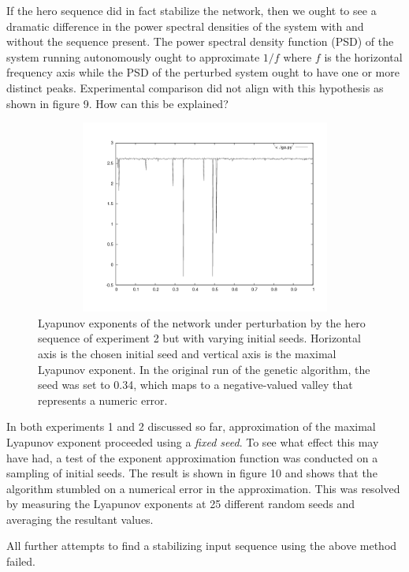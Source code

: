 \documentclass[12pt]{article}
\begin{document}
If the hero sequence did in fact stabilize the network, then we ought to see
a dramatic difference in the power spectral densities of the system with and
without the sequence present.  The power spectral density function (PSD)
of the system running autonomously ought
to approximate $1/f$ where $f$ is the horizontal frequency axis while the PSD of the perturbed system ought to have one or more distinct peaks.  Experimental comparison did not align with this
hypothesis as shown in figure 9.  How can this be explained?

\begin{figure}[htb]
\begin{center}
\includegraphics[height=2.5in,width=4.5in]{images/lyap_hero.png}
\caption{Lyapunov exponents of the network under perturbation by the hero sequence of experiment 2 but with varying initial seeds.  Horizontal axis is the chosen initial seed and vertical axis is the maximal Lyapunov exponent.  In the original run of the genetic algorithm, the seed was set to 0.34, which maps to a negative-valued valley that represents a numeric error.}
\end{center}
\end{figure}

\clearpage

In both experiments 1 and 2 discussed so far, approximation of the maximal
Lyapunov exponent proceeded using a \textit{fixed seed}.  To see what effect
this may have had, a test of the exponent approximation function was conducted
on a sampling of initial seeds.  The result is shown in figure 10 and shows
that the algorithm stumbled on a numerical error in the approximation.
This was resolved by measuring the Lyapunov exponents at 25 different random
seeds and averaging the resultant values.

All further attempts to find a stabilizing input sequence using the above
method failed.
\end{document}
